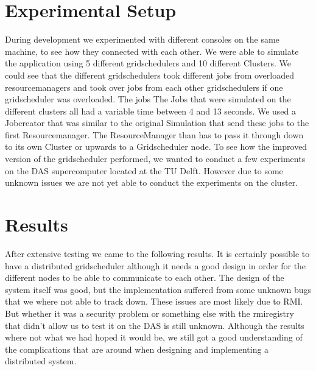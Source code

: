 \documentclass[twocolumn,a4paper]{article}
\begin{document}
\section{Experimental Setup}
During development we experimented with different consoles on the same machine, to see how they connected with each other. We were able to simulate the application using 5 different gridschedulers and 10 different Clusters. We could see that the different gridschedulers took different jobs from overloaded resourcemanagers and took over jobs from each other gridschedulers if one gridscheduler was overloaded. The jobs The Jobs that were simulated on the different clusters all had a variable time between 4 and 13 seconds. We used a Jobcreator that was similar to the original Simulation that send these jobs to the first Resourcemanager. The ResourceManager than has to pass it through down to its own Cluster or upwards to a Gridscheduler node. 
To see how the improved version of the gridscheduler performed, we wanted to conduct a few experiments on the DAS supercomputer located at the TU Delft. However due to some unknown issues we are not yet able to conduct the experiments on the cluster. 

\section{Results}
After extensive testing we came to the following results. It is certainly possible to have a distributed gridscheduler although it needs a good design in order for the different nodes to be able to communicate to each other. The design of the system itself was good, but the implementation suffered from some unknown bugs that we where not able to track down. These issues are most likely due to RMI. But whether it was a security problem or something else with the rmiregistry that didn't allow us to test it on the DAS is still unknown. Although the results where not what we had hoped it would be, we still got a good understanding of the complications that are around when designing and implementing a distributed system.
\end{document}

